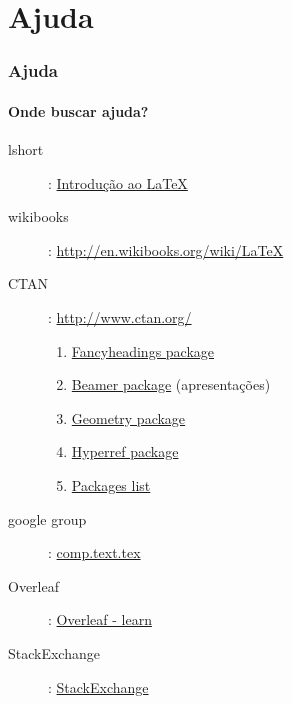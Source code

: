 \documentclass[xcolor={table}]{beamer}
\newcommand{\hrefcolor}[2]{\textcolor{BlueGreen}{\href{#1}{#2}}}
\begin{document}
\section{Ajuda}\label{sec:ajuda}
\begin{frame}[fragile]
\frametitle{Ajuda}
\framesubtitle{Onde buscar ajuda?}
  \begin{description}
  \item[lshort] : \hrefcolor{http://www.ctan.org/tex-archive/info/lshort/portuguese/ptlshort.pdf}{Introdução ao \LaTeX}
  \item[wikibooks] : \hrefcolor{http://en.wikibooks.org/wiki/LaTeX}{http://en.wikibooks.org/wiki/LaTeX}
  \item[CTAN] : \hrefcolor{http://www.ctan.org/}{http://www.ctan.org/}
  \begin{enumerate}
  \item \hrefcolor{https://ctan.org/pkg/fancyhdr}{Fancyheadings package}
  \item \hrefcolor{https://ctan.org/pkg/beamer}{Beamer package} (apresentações)
  \item \hrefcolor{https://ctan.org/pkg/geometry}{Geometry package}
  \item \hrefcolor{https://ctan.org/pkg/hyperref}{Hyperref package}
  \item \hrefcolor{http://en.wikibooks.org/wiki/LaTeX/Packages}{Packages list}
  \end{enumerate}
  \item[google group] : \hrefcolor{https://groups.google.com/forum/?hl=en\#!forum/comp.text.tex}{comp.text.tex}
  \item[Overleaf] : \hrefcolor{https://www.overleaf.com/learn}{Overleaf - learn}
  \item[StackExchange] : \hrefcolor{https://tex.stackexchange.com/}{StackExchange} \end{description}
\end{frame}



\label{bibliografia}
\nocite{*}
\end{document}
